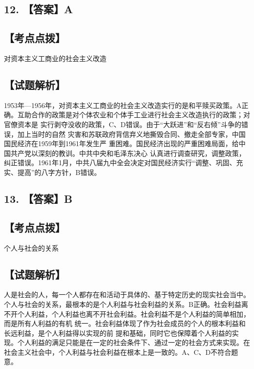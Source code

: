\documentclass[UTF8,11pt]{ctexart}
\begin{document}
\subsection*{12. 【答案】A}

\subsection*{【考点点拨】}

对资本主义工商业的社会主义改造


\subsection*{【试题解析】}

1953年—1956年，对资本主义工商业的社会主义改造实行的是和平赎买政策。A正确。互助合作的政策是对个体农业和个体手工业进行社会主义改造执行的政策；对官僚资本是 实行剥夺没收的政策，C、D错误。由于“大跃进”和“反右倾”斗争的错误，加上当时的自然 灾害和苏联政府背信弃义地撕毁合同、撤走全部专家，中国国民经济在1959年到1961年发生严 重困难。国民经济出现的严重困难局面，给中国共产党以深刻的教训。中共中央和毛泽东决心 认真进行调查研究，调整政策，纠正错误。1961年1月，中共八届九中全会决定对国民经济实行“调整、巩固、充实、提高”的八字方针，B错误。


\subsection*{13. 【答案】B}

\subsection*{【考点点拨】}

个人与社会的关系


\subsection*{【试题解析】}

人是社会的人，每一个人都存在和活动于具体的、基于特定历史的现实社会当中。个人与社会的关系，最根本的是个人利益与社会利益的关系。B正确。社会利益离不开个人利益，个人利益也离不开社会利益。社会利益不是个人利益的简单相加，而是所有人利益的有机 统一。社会利益体现了作为社会成员的个人的根本利益和长远利益，是个人利益得以实现的前 提和基础，同时它也保障着个人利益的实现。个人利益的满足只能是在一定的社会条件下、通过一定的社会方式来实现。在社会主义社会中，个人利益与社会利益在根本上是一致的。A、C、D不符合题意。
\end{document}
